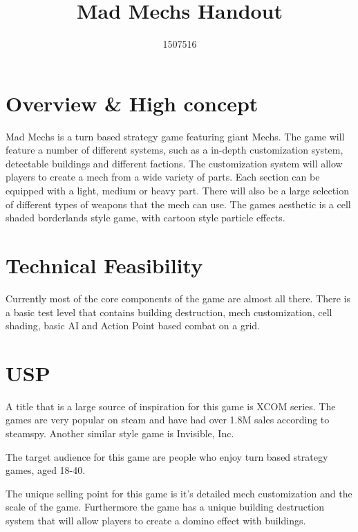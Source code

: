 \documentclass{tufte-handout}
\title{Mad Mechs Handout}
\author{1507516}
\begin{document}
\maketitle


\section{Overview \& High concept}
Mad Mechs is a turn based strategy game featuring giant Mechs.
The game will feature a number of different systems, such as a in-depth customization system, detectable buildings and different factions.
The customization system will allow players to create a mech from a wide variety of parts. Each section can be equipped with a light, medium or heavy part. There will also be a large selection of different types of weapons that the mech can use.
The games aesthetic is a cell shaded borderlands style game, with cartoon style particle effects. 


\section{Technical Feasibility}
Currently most of the core components of the game are almost all there. There is a basic test level that contains building destruction, mech customization, cell shading, basic AI and Action Point based combat on a grid. 


\section{USP}
A title that is a large source of inspiration for this  game is XCOM series. The games are very popular on steam and have had over 1.8M sales according to steamspy.
Another similar style game is Invisible, Inc.

The target audience for this game are people who enjoy turn based strategy games, aged 18-40.

The unique selling point for this game is it’s detailed mech customization and the scale of the game. Furthermore the game has a unique building destruction system that will allow players to create a domino effect with buildings.
\end{document}
